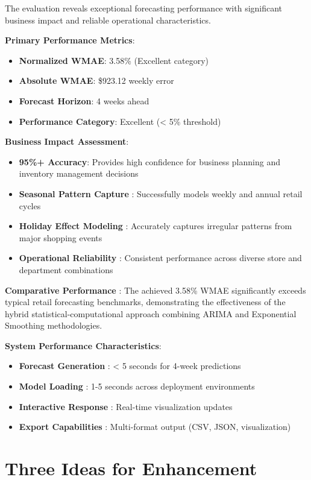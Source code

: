 The evaluation reveals exceptional forecasting performance with significant business impact and reliable operational characteristics.

\textbf{Primary Performance Metrics}:
\begin{itemize}
	\item \textbf{Normalized WMAE}: 3.58\% (Excellent category)
	\item \textbf{Absolute WMAE}: \$923.12 weekly error  
	\item \textbf{Forecast Horizon}: 4 weeks ahead
	\item \textbf{Performance Category}: Excellent (< 5\% threshold)
\end{itemize}

\textbf{Business Impact Assessment}:
\begin{itemize}
	\item \textbf{95\%+ Accuracy}: Provides high confidence for business planning and inventory management decisions
	\item \textbf{Seasonal Pattern Capture }: Successfully models weekly and annual retail cycles
	\item \textbf{Holiday Effect Modeling }: Accurately captures irregular patterns from major shopping events
	\item \textbf{Operational Reliability }: Consistent performance across diverse store and department combinations
\end{itemize}

\textbf{Comparative Performance }: The achieved 3.58\% WMAE significantly exceeds typical retail forecasting benchmarks, demonstrating the effectiveness of the hybrid statistical-computational approach combining ARIMA and Exponential Smoothing methodologies.

\textbf{System Performance Characteristics}:
\begin{itemize}
	\item \textbf{Forecast Generation }: < 5 seconds for 4-week predictions
	\item \textbf{Model Loading }: 1-5 seconds across deployment environments
	\item \textbf{Interactive Response }: Real-time visualization updates
	\item \textbf{Export Capabilities }: Multi-format output (CSV, JSON, visualization)
\end{itemize}

\section{Three Ideas for Enhancement}

